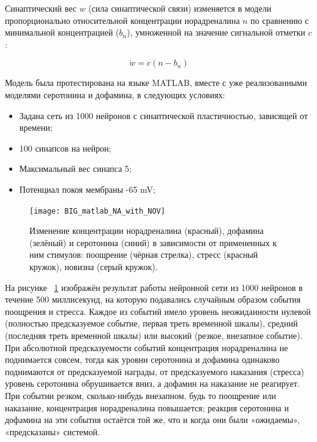 Синаптический вес $w$ (сила синаптической связи) изменяется в модели пропорционально относительной концентрации норадреналина $n$ по сравнению с минимальной концентрацией ($b_n$), умноженной на значение сигнальной отметки $c$:

\begin{equation}\label{eq:6}
\dot{w} = c(n - b_n)
\end{equation}


Модель была протестирована на языке MATLAB, вместе с уже реализованными моделями серотонина и дофамина, в следующих условиях:
\begin{itemize}
\item Задана сеть из 1000 нейронов с синаптической пластичностью, зависящей от времени;
\item 100 синапсов на нейрон;
\item Максимальный вес синапса 5;
\item Потенциал покоя мембраны -65 mV;
\end{itemize}

\begin{figure}
	\centering
	\texttt{[image: BIG\_matlab\_NA\_with\_NOV]}
	\caption{Изменение концентрации норадреналина (красный), дофамина (зелёный) и серотонина (синий) в зависимости от примененных к ним стимулов: поощрение (чёрная стрелка), стресс (красный кружок), новизна (серый кружок).}
	\label{fig:matlab_NA}
\end{figure}

На рисунке ~\ref{fig:matlab_NA} изображён результат работы нейронной сети из 1000 нейронов в течение 500 миллисекунд, на которую подавались случайным образом события поощрения и стресса. Каждое из событий имело уровень неожиданности нулевой (полностью предсказуемое событие, первая треть временной шкалы), средний (последняя треть временной шкалы) или высокий (резкое, внезапное событие).
При абсолютной предсказуемости событий концентрация норадреналина не поднимается совсем, тогда как уровни серотонина и дофамина одинаково поднимаются от предсказуемой награды, от предсказуемого наказания (стресса) уровень серотонина обрушивается вниз, а дофамин на наказание не реагирует.
При событии резком, сколько-нибудь внезапном, будь то поощрение или наказание, концентрация норадреналина повышается; реакция серотонина и дофамина на эти события остаётся той же, что и когда они были «ожидаемы», «предсказаны» системой.


